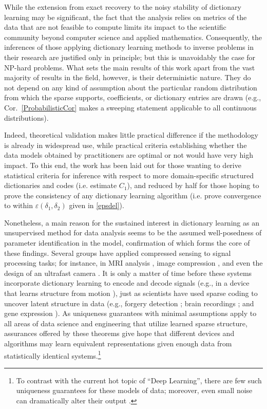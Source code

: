 While the extension from exact recovery to the noisy stability of dictionary learning may be significant, the fact that the analysis relies on metrics of the data that are not feasible to compute limits its impact to the scientific community beyond computer science and applied mathematics. Consequently, the inferences of those applying dictionary learning methods to inverse problems in their research are justified only in principle; but this is unavoidably the case for NP-hard problems. What sets the main results of this work apart from the vast majority of results in the field, however, is their deterministic nature. They do not depend on any kind of assumption about the particular random distribution from which the sparse supports, coefficients, or dictionary entries are drawn (e.g., Cor.~\ref{ProbabilisticCor} makes a sweeping statement applicable to all continuous distributions). 

Indeed, theoretical validation makes little practical difference if the methodology is already in widespread use, while practical criteria establishing whether the data models obtained by practitioners are optimal or not would have very high impact. To this end, the work has been laid out for those wanting to derive statistical criteria for inference with respect to more domain-specific structured dictionaries and codes (i.e. estimate $C_1$), and reduced by half for those hoping to prove the consistency of any dictionary learning algorithm (i.e. prove convergence to within $\varepsilon(\delta_1,\delta_2)$ given in \eqref{epsdel}). 

Nonetheless, a main reason for the sustained interest in dictionary learning as an unsupervised method for data analysis seems to be the assumed well-posedness of parameter identification in the model, confirmation of which forms the core of these findings. Several groups have applied compressed sensing to signal processing tasks; for instance, in MRI analysis \cite{lustig2008compressed}, image compression \cite{Duarte08}, and even the design of an ultrafast camera \cite{Gao14}. It is only a matter of time before these systems incorporate dictionary learning to encode and decode signals (e.g., in a device that learns structure from motion \cite{kong2016prior}), just as scientists have used sparse coding to %
uncover latent structure in data (e.g., forgery detection \cite{hughes2010, olshausen2010applied}; brain recordings \cite{jung2001imaging, agarwal2014spatially, lee2016sparse}; and gene expression \cite{wu2016stability}). As uniqueness guarantees with minimal assumptions apply to all areas of data science and engineering that utilize learned sparse structure, assurances offered by these theorems give hope that different devices and algorithms may learn equivalent representations given enough data from statistically identical systems.\footnote{To contrast with the current hot topic of ``Deep Learning'', there are few such uniqueness guarantees for these models of data; moreover, even small noise can dramatically alter their output \cite{goodfellow2014explaining}.} 


